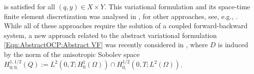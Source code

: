 \documentclass{article}
\numberwithin{equation}{section}
\begin{document}
is satisfied for all $(q,y) \in X \times Y$. This variational formulation
and its space-time finite element discretization was analysed in
\cite{LangerSteinbachYang:2024ACOM}, for other approaches, see, e.g.,
\cite{BeranekReinholdUrban:2023,
  GongHinzeZhou:2012,
  LSTY:GunzburgerKunoth:2011a,
  LangerSteinbachTroeltzschYang:2021SINUM,
  LangerSteinbachTroeltzschYang:2021SISC,
  DMBV2008a,
  DanielsHinzeVierling:2015}.
While all of these approaches require the solution of a coupled
forward-backward system, a new approach related to the abstract
variational formulation \eqref{Eqn:AbstractOCP:Abstract VF} was
recently considered in \cite{LoescherReicheltSteinbach:2024},
where $D$ is induced by the norm of the anisotropic Sobolev space
$H^{1,1/2}_{0;0,}(Q) := L^2(0,T;H^1_0(\Omega)) \cap
H^{1/2}_{0,}(0,T;L^2(\Omega))$.
%
%
\end{document}
